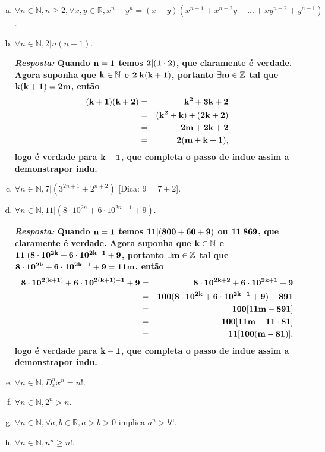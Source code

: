 \begin{enumerate}[{\bf 1.}]
\begin{enumerate}[a)]
\item $\forall n\in\mathbb{N}, n\geq 2, \forall x,y\in\mathbb{R}, x^n-y^n=(x-y)(x^{n-1}+x^{n-2}y+...+xy^{n-2}+y^{n-1})$.
\item $\forall n\in\mathbb{N}, 2|n(n+1)$.

{\bf{\it Resposta:} Quando ${\bf n=1}$ temos ${\bf 2|(1\cdot 2)}$, que claramente é verdade. Agora suponha que ${\bf k\in\mathbb{N}}$ e ${\bf 2|k(k+1)}$, portanto ${\bf \exists m\in\mathbb{Z}}$ tal que ${\bf k(k+1)=2m}$, então
\begin{eqnarray*}
{\bf (k+1)(k+2)}&=&{\bf  k^2+3k+2}\\
                          &=&{\bf  (k^2+k)+(2k+2)}\\
                          &=&{\bf  2m+2k+2}\\
                          &=&{\bf  2(m+k+1)},
\end{eqnarray*}  
logo \'e verdade para ${\bf k+1}$, que completa o passo de indu\cao e assim a demonstra\cao por indu\caoi.}

\item $\forall n\in\mathbb{N}, 7|(3^{2n+1}+2^{n+2})$ [Dica: $9=7+2$].
\item $\forall n\in\mathbb{N}, 11|(8\cdot 10^{2n}+6\cdot 10^{2n-1}+9)$.

{\bf{\it Resposta:} Quando ${\bf n=1}$ temos ${\bf 11|(800+60+9)}$ ou ${\bf 11|869}$,  que claramente é verdade. Agora suponha que ${\bf k\in\mathbb{N}}$ e ${\bf 11|(8\cdot 10^{2k}+6\cdot 10^{2k-1}+9}$, portanto ${\bf \exists m\in\mathbb{Z}}$ tal que ${\bf 8\cdot 10^{2k}+6\cdot 10^{2k-1}+9=11m}$, então
\begin{eqnarray*}
{\bf 8\cdot 10^{2(k+1)}+6\cdot 10^{2(k+1)-1}+9}&=&{\bf  8\cdot 10^{2k+2}+6\cdot 10^{2k+1}+9}\\
                          &=&{\bf  100(8\cdot 10^{2k}+6\cdot 10^{2k-1}+9)-891}\\
                          &=&{\bf  100[11m-891]}\\
                          &=&{\bf  100[11m-11\cdot 81]}\\
                          &=&{\bf  11[100(m-81)]},
\end{eqnarray*}  
logo \'e verdade para ${\bf k+1}$, que completa o passo de indu\cao e assim a demonstra\cao por indu\caoi.}

\item $\forall n\in\mathbb{N}, D^n_x x^n=n!$.
\item $\forall n\in\mathbb{N}, 2^n>n$.
\item $\forall n\in\mathbb{N}, \forall a,b\in\mathbb{R}, a>b>0$ implica $a^n>b^n$.
\item $\forall n\in\mathbb{N}, n^n\geq n!$.


\end{enumerate}
\end{enumerate}
